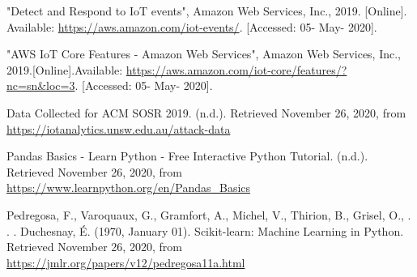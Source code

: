 \documentclass{article}
\begin{document}
\begin{thebibliography}{35}
"Detect and Respond to IoT events", Amazon Web Services, Inc., 2019. [Online]. Available: \url{https://aws.amazon.com/iot-events/}. [Accessed: 05- May- 2020].

"AWS IoT Core Features - Amazon Web Services", Amazon Web Services, Inc., 2019.[Online].Available: \url{https://aws.amazon.com/iot-core/features/?nc=sn&loc=3}. [Accessed: 05- May- 2020].

Data Collected for ACM SOSR 2019. (n.d.). Retrieved November 26, 2020, from \url{https://iotanalytics.unsw.edu.au/attack-data}

Pandas Basics - Learn Python - Free Interactive Python Tutorial. (n.d.). Retrieved November 26, 2020, from \url{https://www.learnpython.org/en/Pandas_Basics}

Pedregosa, F., Varoquaux, G., Gramfort, A., Michel, V., Thirion, B., Grisel, O., . . . Duchesnay, É. (1970, January 01). Scikit-learn: Machine Learning in Python. Retrieved November 26, 2020, from \url{https://jmlr.org/papers/v12/pedregosa11a.html}

\end{thebibliography}
\pagebreak

\end{document}
